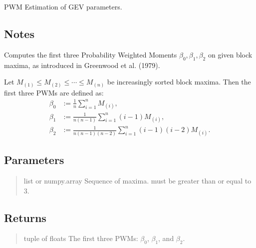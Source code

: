 \documentclass[a4paper,11pt,openany,english]{sphinxmanual}
\begin{document}
\begin{fulllineitems}
\label{\detokenize{api_misc:xtremes.miscellaneous.PWM_estimation}}
\pysigstartsignatures
{}
\pysigstopsignatures
\sphinxAtStartPar
PWM Estimation of GEV parameters.


\subsection{Notes}
\label{\detokenize{api_misc:id22}}
\sphinxAtStartPar
Computes the first three Probability Weighted Moments \(\beta_0,\beta_1,\beta_2\)
on given block maxima, as introduced in Greenwood et al. (1979).

\sphinxAtStartPar
Let \(M_{(1)} \leq M_{(2)} \leq \cdots \leq M_{(n)}\) be increasingly sorted block maxima.
Then the first three PWMs are defined as:
\begin{equation*}
\begin{split}\beta_0 &:= \frac{1}{n}\sum_{i=1}^n M_{(i)},\\
\beta_1 &:= \frac{1}{n(n-1)}\sum_{i=1}^n (i-1) M_{(i)},\\
\beta_2 &:= \frac{1}{n(n-1)(n-2)}\sum_{i=1}^n (i-1)(i-2)M_{(i)}.\end{split}
\end{equation*}

\subsection{Parameters}
\label{\detokenize{api_misc:id23}}\begin{quote}\begin{description}
\sphinxAtStartPar
list or numpy.array
Sequence of maxima.  must be greater than or equal to 3.

\end{description}\end{quote}


\subsection{Returns}
\label{\detokenize{api_misc:id24}}\begin{quote}\begin{description}
\sphinxAtStartPar
tuple of floats
The first three PWMs: \(\beta_0\), \(\beta_1\), and \(\beta_2\).


\end{description}
\end{quote}
\end{fulllineitems}
\end{document}
